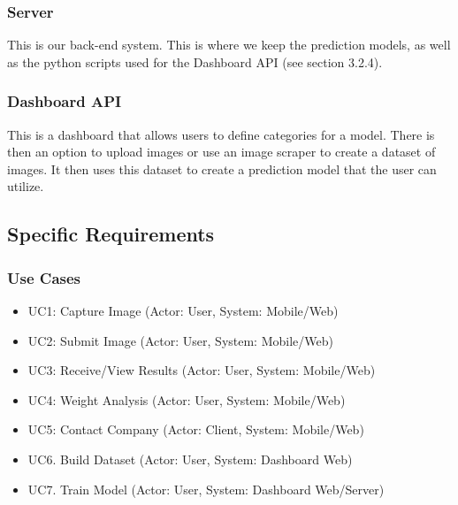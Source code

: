 \documentclass[a4paper, 11pt]{article}
\begin{document}
\subsubsection{Server}
This is our back-end system. This is where we keep the prediction models, as well as the python scripts used for the Dashboard API (see section 3.2.4).
\subsubsection{Dashboard API}
This is a dashboard that allows users to define categories for a model. There is then an option to upload images or use an image scraper to create a dataset of images. It then uses this dataset to create a prediction model that the user can utilize.

\subsection{Specific Requirements}
\subsubsection{Use Cases}
    \begin{itemize}
        \item UC1: Capture Image (Actor: User, System: Mobile/Web)
        \item UC2: Submit Image (Actor: User, System: Mobile/Web)
        \item UC3: Receive/View Results (Actor: User, System: Mobile/Web)
        \item UC4: Weight Analysis (Actor: User, System: Mobile/Web)
        \item UC5: Contact Company (Actor: Client, System: Mobile/Web)
        \item UC6. Build Dataset (Actor: User, System: Dashboard Web)
        \item UC7. Train Model (Actor: User, System: Dashboard Web/Server)
    \end{itemize}
\end{document}
